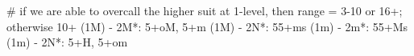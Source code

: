 # if we are able to overcall the higher suit at 1-level, then range = 3-10 or 16+; otherwise 10+
(1M) - 2M*: 5+oM, 5+m 
(1M) - 2N*: 55+ms
(1m) - 2m*: 55+Ms
(1m) - 2N*: 5+H, 5+om